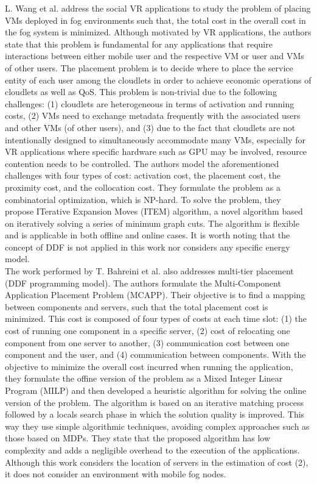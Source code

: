 \noindent\tab L. Wang et al. \cite{wang2018service} address the social VR applications to study the problem of placing VMs deployed in fog environments such that, the total cost in the overall cost in the fog system is minimized. Although motivated by VR applications, the authors state that this problem is fundamental for any applications that require interactions between either mobile user and the respective VM or user and VMs of other users. The placement problem is to decide where to place the service entity of each user among the cloudlets in order to achieve economic operations of cloudlets as well as QoS. This problem is non-trivial due to the following challenges: (1) cloudlets are heterogeneous in terms of activation and running costs, (2) VMs need to exchange metadata frequently with the associated users and other VMs (of other users), and (3) due to the fact that cloudlets are not intentionally designed to simultaneously accommodate many VMs, especially for VR applications where specific hardware such as GPU may be involved, resource contention needs to be controlled. The authors model the aforementioned challenges with four types of cost: activation cost, the placement cost, the proximity cost, and the collocation cost. They formulate the problem as a combinatorial optimization, which is NP-hard. To solve the problem, they propose ITerative Expansion Moves (ITEM) algorithm, a novel algorithm based on iteratively solving a series of minimum graph cuts. The algorithm is flexible and is applicable in both offline and online cases. It is worth noting that the concept of DDF is not applied in this work nor considers any specific energy model.\\
\noindent\tab The work performed by T. Bahreini et al. \cite{bahreini2017efficient} also addresses multi-tier placement (DDF programming model). The authors formulate the Multi-Component Application Placement Problem (MCAPP). Their objective is to find a mapping between components and servers, such that the total placement cost is minimized. This cost is composed of four types of costs at each time slot: (1) the cost of running one component in a specific server, (2) cost of relocating one component from one server to another, (3) communication cost between one component and the user, and (4) communication between components. With the objective to minimize the overall cost incurred when running the application, they formulate the offine version of the problem as a Mixed Integer Linear Program (MILP) and then developed a heuristic algorithm for solving the online version of the problem. The algorithm is based on an iterative matching process followed by a locals search phase in which the solution quality is improved. This way they use simple algorithmic techniques, avoiding complex approaches such as those based on MDPs. They state that the proposed algorithm has low complexity and adds a negligible overhead to the execution of the applications. Although this work considers the location of servers in the estimation of cost (2), it does not consider an environment with mobile fog nodes.\\
